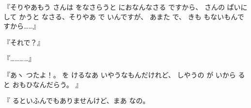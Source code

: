 
『そりやあもう
さんは
をなさらうと
におなんなさる
ですから、
さんの
ぱいに
して
かうと
なさる、そりやあ
で
いんですが、
あまた
で、
きも
もないもんですから……』

『それで？』

『…………』

『あヽ
つたよ！。
を
けるなあ
いやうなもんだけれど、
しやうの
が
いから
ると
おもひなんだらう。
』

『
るといふんでもありませんけど、まあ
なの。


